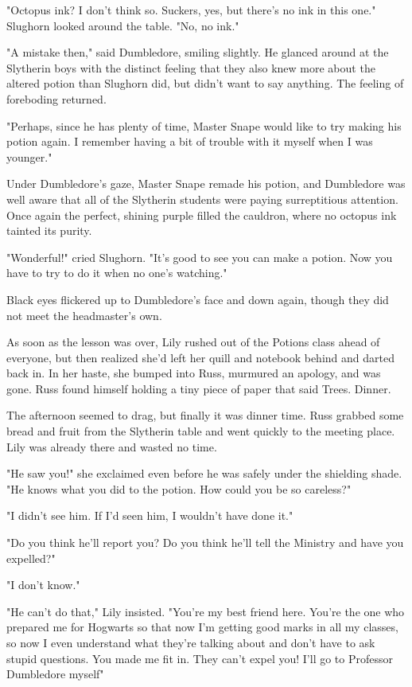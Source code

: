 "Octopus ink? I don't think so. Suckers, yes, but there's no ink in this one." Slughorn looked around the table. "No, no ink."

"A mistake then," said Dumbledore, smiling slightly. He glanced around at the Slytherin boys with the distinct feeling that they also knew more about the altered potion than Slughorn did, but didn't want to say anything. The feeling of foreboding returned.

"Perhaps, since he has plenty of time, Master Snape would like to try making his potion again. I remember having a bit of trouble with it myself when I was younger."

Under Dumbledore's gaze, Master Snape remade his potion, and Dumbledore was well aware that all of the Slytherin students were paying surreptitious attention. Once again the perfect, shining purple filled the cauldron, where no octopus ink tainted its purity.

"Wonderful!" cried Slughorn. "It's good to see you can make a potion. Now you have to try to do it when no one's watching."

Black eyes flickered up to Dumbledore's face and down again, though they did not meet the headmaster's own.

As soon as the lesson was over, Lily rushed out of the Potions class ahead of everyone, but then realized she'd left her quill and notebook behind and darted back in. In her haste, she bumped into Russ, murmured an apology, and was gone. Russ found himself holding a tiny piece of paper that said Trees. Dinner.

The afternoon seemed to drag, but finally it was dinner time. Russ grabbed some bread and fruit from the Slytherin table and went quickly to the meeting place. Lily was already there and wasted no time.

"He saw you!" she exclaimed even before he was safely under the shielding shade. "He knows what you did to the potion. How could you be so careless?"

"I{\el} didn't see him. If I'd{\el} seen him, I wouldn't have{\el} done it."

"Do you think he'll report you? Do you think he'll tell the Ministry and have you expelled?"

"I{\el} don't know."

"He can't do that," Lily insisted. "You're my best friend here. You're the one who prepared me for Hogwarts so that now I'm getting good marks in all my classes, so now I even understand what they're talking about and don't have to ask stupid questions. You made me fit in. They can't expel you! I'll go to Professor Dumbledore myself{\el}"

